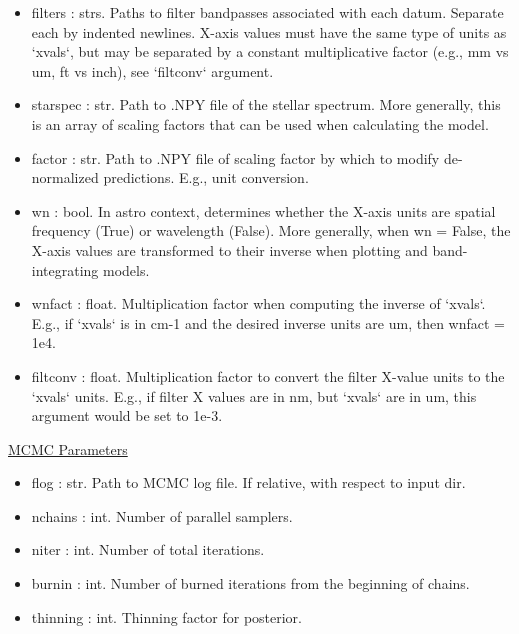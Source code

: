 \documentclass[letterpaper, 12pt]{article}
\begin{document}
\begin{itemize}
\item filters     : strs. Paths to filter bandpasses associated with each datum. 
                    Separate each by indented newlines.
                    X-axis values must have the same type of units as `xvals`,
                    but may be separated by a constant multiplicative factor
                    (e.g., mm vs um, ft vs inch), see `filtconv` argument.
\item starspec    : str.  Path to .NPY file of the stellar spectrum.
                    More generally, this is an array of scaling factors that 
                    can be used when calculating the model.
\item factor      : str.  Path to .NPY file of scaling factor by which 
                    to modify de-normalized predictions. 
                    E.g., unit conversion.
\item wn          : bool. In astro context, determines whether the X-axis units are 
                    spatial frequency (True) or wavelength (False).
                    More generally, when wn = False, the X-axis values are 
                    transformed to their inverse when plotting and 
                    band-integrating models.  
\item wnfact      : float. Multiplication factor when computing the inverse of 
                     `xvals`.
                     E.g., if `xvals` is in cm-1 and the desired inverse units 
                     are um, then wnfact = 1e4.
\item filtconv    : float. Multiplication factor to convert the filter 
                     X-value units to the `xvals` units.
                     E.g., if filter X values are in nm, but `xvals` are in um, 
                     this argument would be set to 1e-3.
\end{itemize}


\noindent \underline{MCMC Parameters}
\begin{itemize}
\item flog        : str.  Path to MCMC log file. 
                          If relative, with respect to input dir.
\item nchains     : int.  Number of parallel samplers.
\item niter       : int.  Number of total iterations.
\item burnin      : int.  Number of burned iterations from the beginning of 
                          chains.
\item thinning    : int.  Thinning factor for posterior.
\end{itemize}
\end{document}
